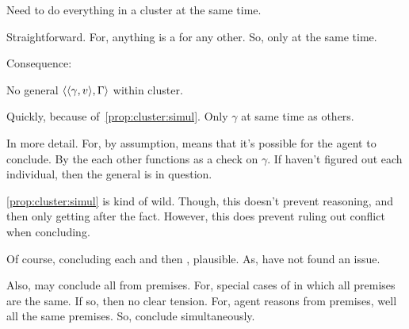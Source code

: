 \begin{note}
  \begin{proposition}
    \label{prop:cluster:simul}
    Need to do everything in a cluster at the same time.
  \end{proposition}

  \begin{argument}
    Straightforward.
    For, anything is a \requ{} for any other.
    So, only \csV{} at the same time.
  \end{argument}
\end{note}

\begin{note}[No \(\gamma\)]
  Consequence:

  \begin{corollary}
    \label{prop:cluster:no-general}
    No general \(\langle \langle \gamma, v \rangle, \Gamma \rangle\) within cluster.
  \end{corollary}

  \begin{argument}
    Quickly, because of~\ref{prop:cluster:simul}.
    Only \(\gamma\) at same time as others.

    In more detail.
    For, by assumption, \requ{} means that it's possible for the agent to conclude.
    By the each other \requ{} functions as a check on \(\gamma\).
    If haven't figured out each individual, then the general is in question.
  \end{argument}
\end{note}

\begin{note}
  \autoref{prop:cluster:simul} is kind of wild.
  Though, this doesn't prevent reasoning, and then only getting \csN{} after the fact.
  However, this does prevent ruling out conflict when concluding.

  Of course, concluding each and then \csVImp{}, plausible.
  As, have not found an issue.

  Also, may conclude all from premises.
  For, special cases of \cluster{} in which all premises are the same.
  If so, then no clear tension.
  For, agent reasons from premises, well all the same premises.
  So, conclude simultaneously.
\end{note}

